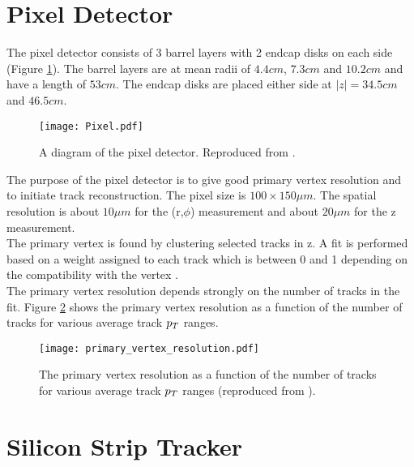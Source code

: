\section{Pixel Detector}

The pixel detector consists of 3 barrel layers with 2 endcap disks on each side
(Figure \ref{fig:Pixel}). The barrel layers are at mean radii of $4.4\unit{cm}$,
$7.3\unit{cm}$ and $10.2\unit{cm}$ and have a length of $53\unit{cm}$. The 
endcap disks are placed either side at $|z| = 34.5\unit{cm}$ and 
$46.5\unit{cm}$. \\

\begin{figure}
\texttt{[image: Pixel.pdf]}
\caption{A diagram of the pixel detector. Reproduced from \cite{physics_tdr_1}.}
\label{fig:Pixel}
\end{figure}

The purpose of the pixel detector is to give good primary vertex resolution and
to initiate track reconstruction. The pixel size is $100\times150\unit{\mu m}$. 
The spatial resolution is about $10\unit{\mu m}$ for the (r,$\phi$) measurement 
and about $20\unit{\mu m}$ for the z measurement. \\

The primary vertex is found by clustering selected tracks in z. A fit is
performed based on a weight assigned to each track which is between 0 and 1
depending on the compatibility with the vertex \cite{primary_vertex}. \\

The primary vertex resolution depends strongly on the number of tracks in the
fit. Figure \ref{fig:primary_vertex} shows the primary vertex resolution as a
function of the number of tracks for various average track $p_{T}$ ranges.

\begin{figure}
\begin{center}
\texttt{[image: primary\_vertex\_resolution.pdf]}
\end{center}
\caption{The primary vertex resolution as a function of the number of tracks for
various average track $p_{T}$ ranges (reproduced from \cite{primary_vertex}).}
\label{fig:primary_vertex}
\end{figure}

\section{Silicon Strip Tracker}

